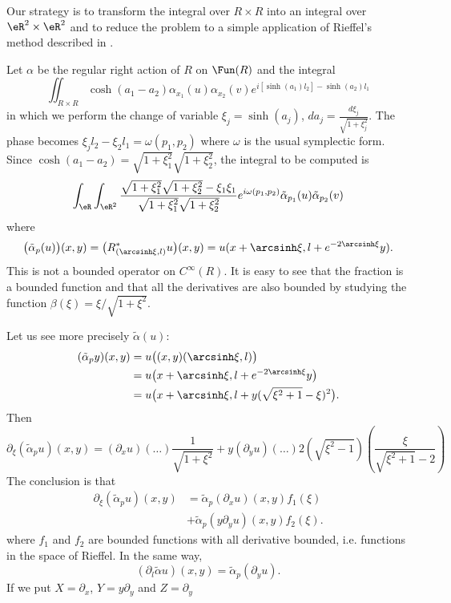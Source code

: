 Our strategy is to transform the integral over $R\times R$ into an integral over $\eR^2\times\eR^2$ and to reduce the problem to a simple application of Rieffel's method described in \cite{Rieffel}.

Let $\alpha$ be the regular right action of $R$ on $\Fun(R)$ and the integral
\begin{equation}
	\iint_{R\times R}\cosh(a_1-a_2)\alpha_{x_1}(u)\alpha_{x_2}(v)e^{i[\sinh(a_1)l_2]-\sinh(a_2)l_1}
\end{equation}
in which we perform the change of variable $\xi_j=\sinh(a_j)$, $da_j=\frac{ d\xi_j }{ \sqrt{1+\xi_j^2} }$. The phase becomes $\xi_jl_2-\xi_2l_1=\omega(p_1,p_2)$ where $\omega$ is the usual symplectic form. Since $\cosh(a_1-a_2)=\sqrt{1+\xi_1^2}\sqrt{1+\xi_2^2}$, the integral to be computed  is
\[
	\int_{\eR}\int_{\eR^2}\frac{ \sqrt{1+\xi_1^2}\sqrt{1+\xi_2^2}-\xi_1\xi_1  }{ \sqrt{1+\xi_1^2} \sqrt{1+\xi_2^2}  }e^{i\omega(p_1,p_2)} \tilde\alpha_{p_1}(u)\tilde\alpha_{p_2}(v)
\]
where
\begin{equation}
	\big( \tilde\alpha_p(u) \big)(x,y)=\big( R^*_{(\arcsinh\xi,l)}u \big)(x,y)=u( x+\arcsinh\xi,l+e^{-2\arcsinh\xi}y ).
\end{equation}
This is not a bounded operator on $ C^{\infty}(R)$.
It is easy to see that the fraction is a bounded function and that all the derivatives are also bounded by studying the function $\beta(\xi)=\xi/\sqrt{1+\xi^2}$.

Let us see more precisely $\tilde\alpha(u)$:
\begin{equation}
	\begin{split}
		(\tilde\alpha_py)(x,y)&=u\big( (x,y)(\arcsinh\xi,l) \big)\\
		&=u\big( x+\arcsinh\xi,l+e^{-2\arcsinh\xi}y \big)\\
		&=u\big( x+\arcsinh\xi,l+y(\sqrt{\xi^2+1}-\xi)^2 \big).
	\end{split}
\end{equation}
Then
\begin{equation}
	\partial_{\xi}(\tilde\alpha_pu)(x,y)=(\partial_xu)(\ldots)\frac{1}{ \sqrt{ 1+\xi^2 }}+y(\partial_yu)(\ldots)2(\sqrt{\xi^2-1})(\frac{ \xi }{ \sqrt{\xi^2+1}-2 })
\end{equation}
The conclusion is that
\begin{equation}
	\begin{split}
		\partial_{\xi}(\tilde\alpha_pu)(x,y)&=\tilde\alpha_p(\partial_xu)(x,y)f_1(\xi)\\
		&+\tilde\alpha_p(y\partial_yu)(x,y)f_2(\xi).
	\end{split}
\end{equation}
where $f_1$ and $f_2$ are bounded functions with all derivative bounded, i.e. functions in the space of Rieffel. In the same way,
\begin{equation}
	(\partial_l\tilde\alpha u)(x,y)=\tilde\alpha_p(\partial_yu).
\end{equation}
If we put $X=\partial_x$, $Y=y\partial_y$ and $Z=\partial_y$


